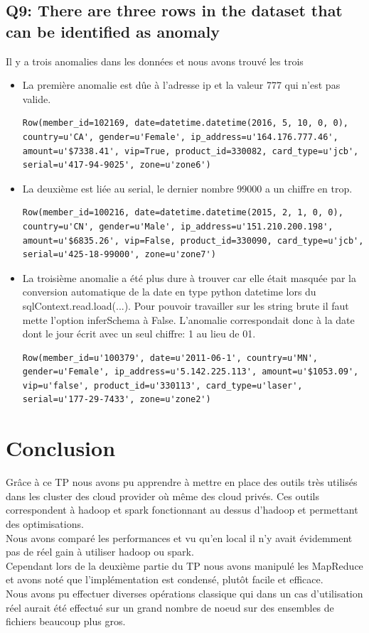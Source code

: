 \documentclass[11pt]{article}
\begin{document}
\subsection*{Q9: There are three rows in the dataset that can be identified as anomaly}
	Il y a trois anomalies dans les données et nous avons trouvé les trois
	\begin{itemize}
		\item La première anomalie est dûe à l'adresse ip et la valeur 777 qui n'est
	pas valide.\\
	\begin{lstlisting}[style=myPython]
	Row(member_id=102169, date=datetime.datetime(2016, 5, 10, 0, 0), country=u'CA', gender=u'Female', ip_address=u'164.176.777.46', amount=u'$7338.41', vip=True, product_id=330082, card_type=u'jcb', serial=u'417-94-9025', zone=u'zone6')
	\end{lstlisting}
		\item La deuxième est liée au serial, le dernier nombre 99000 a un chiffre en
	trop.\\
	\begin{lstlisting}[style=myPython]
	Row(member_id=100216, date=datetime.datetime(2015, 2, 1, 0, 0), country=u'CN', gender=u'Male', ip_address=u'151.210.200.198', amount=u'$6835.26', vip=False, product_id=330090, card_type=u'jcb', serial=u'425-18-99000', zone=u'zone7')
	\end{lstlisting}
		\item La troisième anomalie a été plus dure à trouver car elle était masquée
	par la conversion automatique de la date en type python datetime lors du
	sqlContext.read.load(...). Pour pouvoir travailler sur les string brute
	il faut mette l'option inferSchema à False. L'anomalie correspondait
	donc à la date dont le jour écrit avec un seul chiffre: 1 au lieu de 01.
	\begin{lstlisting}[style=myPython]
	Row(member_id=u'100379', date=u'2011-06-1', country=u'MN', gender=u'Female', ip_address=u'5.142.225.113', amount=u'$1053.09', vip=u'false', product_id=u'330113', card_type=u'laser', serial=u'177-29-7433', zone=u'zone2')
	\end{lstlisting}
	\end{itemize}
\section{Conclusion}
	Grâce à ce TP nous avons pu apprendre à mettre en place des outils
	très utilisés dans les cluster des cloud provider où même des cloud
	privés. Ces outils correspondent à hadoop et spark fonctionnant
	au dessus d'hadoop et permettant des optimisations. \\
	Nous avons comparé les performances et vu qu'en local il n'y avait
	évidemment pas de réel gain à utiliser hadoop ou spark. \\
	Cependant lors de la deuxième partie du TP nous avons 
	manipulé les MapReduce et avons noté que l'implémentation est
	condensé, plutôt facile et efficace. \\
	Nous avons pu effectuer diverses opérations classique qui dans un
	cas d'utilisation réel aurait été effectué sur un grand nombre de noeud
	sur des ensembles de fichiers beaucoup plus gros.
\end{document}
